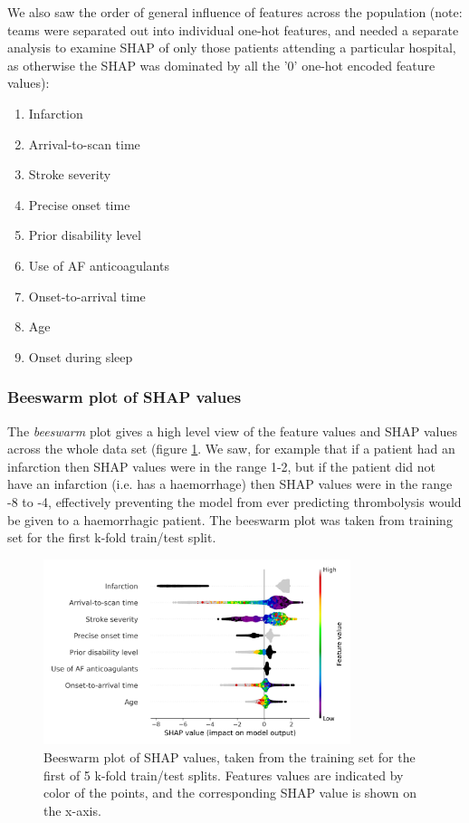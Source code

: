 We also saw the order of general influence of features across the population (note: teams were separated out into individual one-hot features, and needed a separate analysis to examine SHAP of only those patients attending a particular hospital, as otherwise the SHAP was dominated by all the '0' one-hot encoded feature values):

\begin{enumerate}
\item Infarction
\item Arrival-to-scan time
\item Stroke severity
\item Precise onset time
\item Prior disability level
\item Use of AF anticoagulants
\item Onset-to-arrival time
\item Age
\item Onset during sleep
\end{enumerate}


\subsubsection{Beeswarm plot of SHAP values}

The \emph{beeswarm} plot gives a high level view of the feature values and SHAP values across the whole data set (figure \ref{fig:beeswarm}. We saw, for example that if a patient had an infarction then SHAP values were in the range 1-2, but if the patient did not have an infarction (i.e. has a haemorrhage) then SHAP values were in the range -8 to -4, effectively preventing the model from ever predicting thrombolysis would be given to a haemorrhagic patient. The beeswarm plot was taken from training set for the first k-fold train/test split.

\begin{figure}
\centering
\includegraphics[width=0.8\textwidth]{./images/03_xgb_10_features_beeswarm}
\caption{Beeswarm plot of SHAP values, taken from the training set for the first of 5 k-fold train/test splits. Features values are indicated by color of the points, and the corresponding SHAP value is shown on the x-axis.}
\label{fig:beeswarm}
\end{figure}



